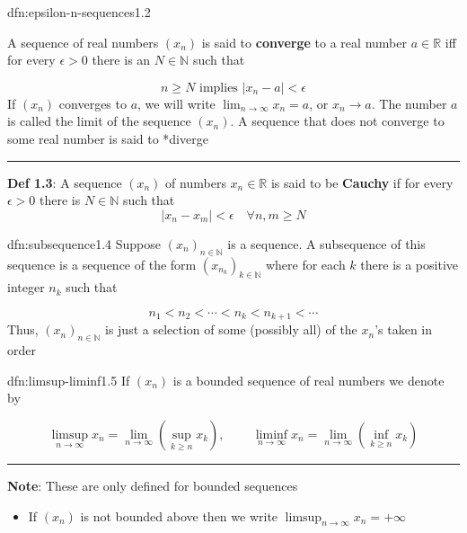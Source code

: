 \documentclass[landscape, 8pt]{extarticle}
\begin{document}
\begin{multicols}{3}
\begin{dfn}{dfn:epsilon-n-sequences}{1.2}

	A sequence of real numbers $(x_{n})$ is said to \textbf{converge} to a real number $a\in \mathbb{R}$ iff for every $\epsilon>0$ there is an $N\in\mathbb{N}$ such that

	\vspace{-5pt}
	\[n\ge N \text{ implies } \lvert x_{n} - a \rvert < \epsilon\]
	If $(x_{n})$ converges to $a$, we will write $\lim_{n \to \infty} x_{n}=a$, or $x_{n}\to a$. The number $a$ is called the limit of the sequence $(x_{n})$. A sequence that does not converge to some real number is said to *diverge

	\noindent\rule{\textwidth}{0.2pt}
	\textbf{Def 1.3}: A sequence $(x_{n})$ of numbers $x_{n} \in \mathbb{R}$ is said to be \textbf{Cauchy} if for every $\epsilon > 0$ there is $N\in \mathbb{N}$ such that
	\[\lvert x_{n} - x_{m} \rvert < \epsilon \quad \forall n,m\ge N\]

\end{dfn}

\begin{dfn}[Subsequences]{dfn:subsequence}{1.4}
	Suppose $(x_{n})_{n\in\mathbb{N}}$ is a sequence. A subsequence of this sequence is a sequence of the form $(x_{n_{k}})_{k\in\mathbb{N}}$ where for each $k$ there is a positive integer $n_{k}$ such that

	\vspace{-5pt}
	\[n_{1} < n_{2} < \cdots < n_{k} < n_{k+1} < \cdots\]
	Thus, $(x_{n})_{n\in\mathbb{N}}$ is just a selection of some (possibly all) of the $x_{n}$'s taken in order

\end{dfn}


\begin{dfn}{dfn:limsup-liminf}{1.5}
	If $(x_{n})$ is a bounded sequence of real numbers we denote by

	\vspace{-5pt}
	\[\limsup_{{n\to\infty}} x_{n} = \lim_{n \to \infty} \left(\displaystyle \sup_{k\ge n} x_{k}\right),\,\qquad \liminf_{{n\to\infty}} x_{n} = \lim_{n \to \infty} \left(\displaystyle \inf_{k\ge n} x_{k}\right)\]

	\noindent\rule{\textwidth}{0.2pt}
	\textbf{Note}: These are only defined for bounded sequences

	\vspace{-5pt}
	\begin{itemize}[leftmargin=*]
		\setlength\itemsep{0em}
		\item If $(x_{n})$ is not bounded above then we write $\limsup_{n \to \infty} x_{n} = +\infty$


\end{itemize}
\end{dfn}
\end{multicols}
\end{document}
